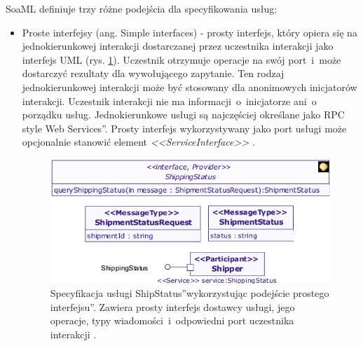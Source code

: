 SoaML definiuje trzy różne podejścia dla specyfikowania usług: 
\begin{itemize}
\item{Proste interfejsy (ang. Simple interfaces) - prosty interfejs, który opiera się na jednokierunkowej interakcji dostarczanej przez uczestnika interakcji jako interfejs UML (rys. \ref{simple_interface_based_approach}). Uczestnik otrzymuje operacje na swój port~i~może dostarczyć rezultaty dla wywołującego zapytanie. Ten rodzaj jednokierunkowej interakcji może być stosowany dla anonimowych inicjatorów interakcji. Uczestnik interakcji nie ma informacji~o~inicjatorze ani~o~ porządku usług. Jednokierunkowe usługi są najczęściej określane jako \quotedblbase RPC style Web Services\textquotedblright. Prosty interfejs wykorzystywany jako port usługi może opcjonalnie stanowić element \emph{<<ServiceInterface>>} \cite{SOAMLOMG}.
\begin{figure}[h!tbp]
\begin{centering}
\includegraphics[width=11cm]{img/simple_interface_based_approach.png}
\caption[Specyfikacja usługi \quotedblbase ShipStatus\textquotedblright wykorzystując podejście \quotedblbase prostego interfejsu\textquotedblright. Zawiera prosty interfejs dostawcy usługi, jego operacje, typy wiadomości~i~odpowiedni port uczestnika interakcji.]{Specyfikacja usługi \quotedblbase ShipStatus\textquotedblright wykorzystując podejście \quotedblbase prostego interfejsu\textquotedblright. Zawiera prosty interfejs dostawcy usługi, jego operacje, typy wiadomości~i~odpowiedni port uczestnika interakcji \cite{SoaMLErvBase}.}\label{simple_interface_based_approach}
\end{centering}
\end{figure}
} 


\end{itemize}
